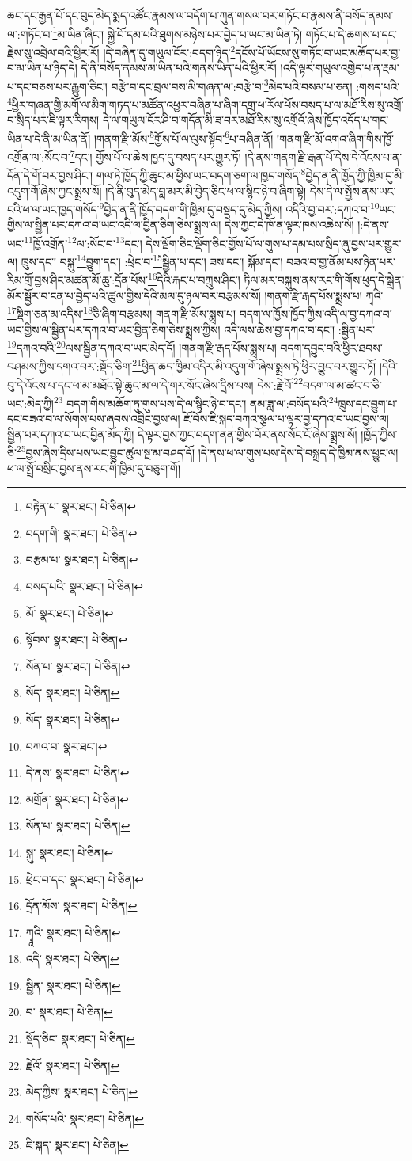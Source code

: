 ཆང་དང་རྒྱན་པོ་དང་བུད་མེད་སྨད་འཚོང་རྣམས་ལ་བདོག་པ་ཀུན་གསལ་བར་གཏོང་བ་རྣམས་ནི་བསོད་ནམས་ལ་:གཏོང་བ་\footnote{བརྟེན་པ་  སྣར་ཐང་།  པེ་ཅིན། }མ་ཡིན་ཞིང་། སྐྱེ་བོ་དམ་པའི་ཐུགས་མཉེས་པར་བྱེད་པ་ཡང་མ་ཡིན་ཏེ། གཏོང་པ་དེ་ཆགས་པ་དང་རྗེས་སུ་འབྲེལ་བའི་ཕྱིར་རོ། །དེ་བཞིན་དུ་གཡུལ་ངོར་:བདག་ཉིད་\footnote{བདག་གི་  སྣར་ཐང་།  པེ་ཅིན། }དངོས་པོ་ཡོངས་སུ་གཏོང་བ་ཡང་མཆོད་པར་བྱ་བ་མ་ཡིན་པ་ཉིད་དེ། དེ་ནི་བསོད་ནམས་མ་ཡིན་པའི་གནས་ཡིན་པའི་ཕྱིར་རོ། །འདི་ལྟར་གཡུལ་འགྱེད་པ་ན་རྔམ་པ་དང་བཅས་པར་རྒྱུག་ཅིང་། བརྩེ་བ་དང་བྲལ་བས་མི་གཞན་ལ་:བརྩེ་བ་\footnote{བརྩམ་པ་  སྣར་ཐང་།  པེ་ཅིན། }མེད་པའི་བསམ་པ་ཅན། :གསད་པའི་\footnote{བསད་པའི་  སྣར་ཐང་།  པེ་ཅིན། }ཕྱིར་གཞན་གྱི་མགོ་ལ་མིག་གཏད་པ་མཚོན་འཕྱར་བཞིན་པ་ཞིག་དགྲ་ཕ་རོལ་པོས་བསད་པ་ལ་མཐོ་རིས་སུ་འགྲོ་བ་སྲིད་པར་ཇི་ལྟར་རིགས། དེ་ལ་གཡུལ་ངོར་ཤི་བ་གདོན་མི་ཟ་བར་མཐོ་རིས་སུ་འགྲོའོ་ཞེས་ཁྱོད་འདོད་པ་གང་ཡིན་པ་དེ་ནི་མ་ཡིན་ནོ། །གནག་རྫི་མོས་\footnote{མོ་  སྣར་ཐང་།  པེ་ཅིན། }གྱོས་པོ་ལ་ལུས་སྟོབ་\footnote{སྟོབས་  སྣར་ཐང་།  པེ་ཅིན། }པ་བཞིན་ནོ། །གནག་རྫི་མོ་འགའ་ཞིག་གིས་ཁྱོ་འགྲོན་ལ་:སོང་བ་\footnote{སོན་པ་  སྣར་ཐང་།  པེ་ཅིན། }དང་། གྱོས་པོ་ལ་ཆེས་ཁྱད་དུ་བསད་པར་གྱུར་ཏོ། །དེ་ནས་གནག་རྫི་རྒན་པོ་དེས་དེ་འོངས་པ་ན་དོན་དེ་གོ་བར་བྱས་ཤིང་། གལ་ཏེ་ཁྱོད་ཀྱི་ཆུང་མ་ཕྱིས་ཡང་བདག་ཅག་ལ་ཁྱད་གསོད་\footnote{སོད་  སྣར་ཐང་།  པེ་ཅིན། }བྱེད་ན་ནི་ཁྱོད་ཀྱི་ཁྱིམ་དུ་མི་འདུག་གོ་ཞེས་ཀྱང་སྨྲས་སོ། །དེ་ནི་བུད་མེད་བླ་མར་མི་བྱེད་ཅིང་ཕ་ལ་སྙིང་ཉེ་བ་ཞིག་སྟེ། དེས་དེ་ལ་སྤྱོས་ནས་ཡང་ངའི་ཕ་ལ་ཡང་ཁྱད་གསོད་\footnote{སོད་  སྣར་ཐང་།  པེ་ཅིན། }བྱེད་ན་ནི་ཁྱོད་བདག་གི་ཁྱིམ་དུ་བསྡད་དུ་མེད་ཀྱིས། འདིའི་བྱ་བར་:དཀའ་བ་\footnote{བཀའ་བ་  སྣར་ཐང་། }ཡང་གྱིས་ལ་སྦྱིན་པར་དཀའ་བ་ཡང་འདི་ལ་བྱིན་ཅིག་ཅེས་སྨྲས་ལ། དེས་ཀྱང་དེ་ཁོ་ན་ལྟར་ཁས་འཆེས་སོ། །:དེ་ནས་ཡང་\footnote{དེ་ནས་  སྣར་ཐང་།  པེ་ཅིན། }ཁྱོ་འགྲོན་\footnote{མགྲོན་  སྣར་ཐང་།  པེ་ཅིན། }ལ་:སོང་བ་\footnote{སོན་པ་  སྣར་ཐང་།  པེ་ཅིན། }དང་། དེས་ལྡོག་ཅིང་ལྡོག་ཅིང་གྱོས་པོ་ལ་གུས་པ་དམ་པས་སྲིད་ཞུ་བྱས་པར་གྱུར་ལ། ཁྲུས་དང་། བསྐུ་\footnote{སྐུ་  སྣར་ཐང་།  པེ་ཅིན། }བྱུག་དང་། :ཕྲེང་བ་\footnote{ཕྲེང་བ་དང་  སྣར་ཐང་།  པེ་ཅིན། }སྦྱིན་པ་དང་། ཟས་དང་། སྐོམ་དང་། བཟའ་བ་གྱ་ནོམ་པས་ཉིན་པར་རིམ་གྲོ་བྱས་ཤིང་མཚན་མོ་ཆུ་:དྲོན་པོས་\footnote{དྲོན་མོས་  སྣར་ཐང་།  པེ་ཅིན། }དེའི་རྐང་པ་བཀྲུས་ཤིང་། ཏིལ་མར་བསྐུས་ནས་རང་གི་གོས་ཕུད་དེ་སྒྲེན་མོར་སྦྱོར་བ་ངན་པ་བྱེད་པའི་ཚུལ་གྱིས་དེའི་མལ་དུ་ཉལ་བར་བརྩམས་སོ། །གནག་རྫི་རྒད་པོས་སྨྲས་པ། ཀྭའི་\footnote{ཀྭཱའི་  སྣར་ཐང་།  པེ་ཅིན། }སྡིག་ཅན་མ་འདིས་\footnote{འདི་  སྣར་ཐང་།  པེ་ཅིན། }ཅི་ཞིག་བརྩམས། གནག་རྫི་མོས་སྨྲས་པ། བདག་ལ་ཁྱོས་ཁྱོད་ཀྱིས་འདི་ལ་བྱ་དཀའ་བ་ཡང་གྱིས་ལ་སྦྱིན་པར་དཀའ་བ་ཡང་བྱིན་ཅིག་ཅེས་སྨྲས་ཀྱིས། འདི་ལས་ཆེས་བྱ་དཀའ་བ་དང་། :སྦྱིན་པར་\footnote{སྦྱིན་  སྣར་ཐང་།  པེ་ཅིན། }དཀའ་བའི་\footnote{བ་  སྣར་ཐང་།  པེ་ཅིན། }ལས་སྦྱིན་དཀའ་བ་ཡང་མེད་དོ། །གནག་རྫི་རྒད་པོས་སྨྲས་པ། བདག་དབྱུང་བའི་ཕྱིར་ཐབས་བཤམས་ཀྱིས་དགའ་བར་:སྡོད་ཅིག་\footnote{སྡོད་ཅིང་  སྣར་ཐང་།  པེ་ཅིན། }ཕྱིན་ཆད་ཁྱིམ་འདིར་མི་འདུག་གོ་ཞེས་སྨྲས་ཏེ་ཕྱིར་བྱུང་བར་གྱུར་ཏོ། །དེའི་བུ་དེ་འོངས་པ་དང་ཕ་མ་མཐོང་སྟེ་ཆུང་མ་ལ་དེ་གར་སོང་ཞེས་དྲིས་པས། དེས་:རྗེ་བོ་\footnote{རྗེའོ་  སྣར་ཐང་།  པེ་ཅིན། }བདག་ལ་མ་ཚང་བ་ཅི་ཡང་:མེད་ཀྱི།\footnote{མེད་ཀྱིས།  སྣར་ཐང་།  པེ་ཅིན། } བདག་གིས་མཆོག་ཏུ་གུས་པས་དེ་ལ་སྙིང་ཉེ་བ་དང་། ནམ་ཟླ་ལ་:བསོད་པའི་\footnote{གསོད་པའི་  སྣར་ཐང་།  པེ་ཅིན། }ཁྲུས་དང་བྱུག་པ་དང་བཟའ་བ་ལ་སོགས་པས་ཞབས་འབྲིང་བྱས་ལ། ཇོ་བོས་ཇི་སྐད་བཀའ་སྩལ་པ་ལྟར་བྱ་དཀའ་བ་ཡང་བྱས་ལ། སྦྱིན་པར་དཀའ་བ་ཡང་བྱིན་མོད་ཀྱི། དེ་ལྟར་བྱས་ཀྱང་བདག་ནན་གྱིས་བོར་ནས་སོང་ངོ་ཞེས་སྨྲས་སོ། །ཁྱོད་ཀྱིས་ཅི་\footnote{ཇི་སྐད་  སྣར་ཐང་།  པེ་ཅིན། }བྱས་ཞེས་དྲིས་པས་ཡང་བྱུང་ཚུལ་སྔ་མ་བཤད་དོ། །དེ་ནས་ཕ་ལ་གུས་པས་དེས་དེ་བསྐྲད་དེ་ཁྱིམ་ནས་ཕྱུང་ལ། ཕ་ལ་སྤྲོ་བསྲིང་བྱས་ནས་རང་གི་ཁྱིམ་དུ་བཅུག་གོ། 